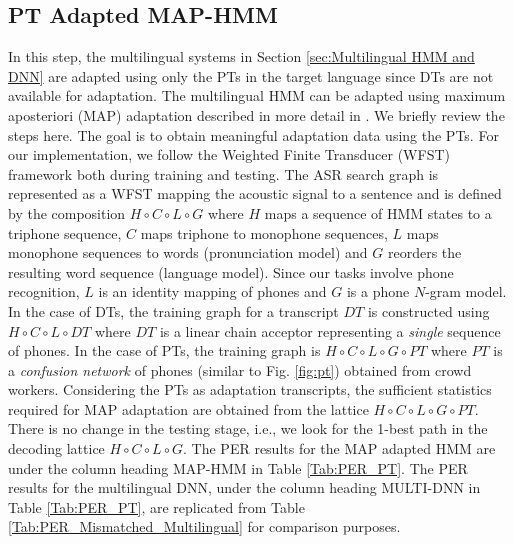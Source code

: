 \documentclass[a4paper]{article}
\begin{document}
\subsection{PT Adapted MAP-HMM} \vspace{-1mm}
\label{sec:PT Adapted MAP-HMM}
In this step, the multilingual systems in Section \ref{sec:Multilingual HMM and DNN} are adapted using only the PTs in the target language since DTs are not available for adaptation. The multilingual HMM can be adapted using maximum aposteriori (MAP) adaptation described in more detail in \cite{Liu-PTAdaptedGMM}. We briefly review the steps here. The goal is to obtain meaningful adaptation data using the PTs. For our implementation, we follow the Weighted Finite Transducer (WFST)~\cite{Mohri-WFST} framework both during training and testing. The ASR search graph is represented as a WFST mapping the acoustic signal to a sentence and is defined by the composition $H \circ C \circ L \circ G$ where $H$ maps a sequence of HMM states to a triphone sequence, $C$ maps triphone to monophone sequences, $L$ maps monophone sequences to words (pronunciation model) and $G$ reorders the resulting word sequence (language model). Since our tasks involve phone recognition, $L$ is an identity mapping of phones and $G$ is a phone $N$-gram model. In the case of DTs, the training graph for a transcript $DT$ is constructed using $H \circ C \circ L \circ DT$ where $DT$ is a linear chain acceptor representing a \emph{single} sequence of phones. In the case of PTs, the training graph is $H \circ C \circ L \circ G \circ PT$ where $PT$ is a \emph{confusion network} of phones (similar to Fig. \ref{fig:pt}) obtained from crowd workers. Considering the PTs as adaptation transcripts, the sufficient statistics required for MAP adaptation are obtained from the lattice  $H \circ C \circ L \circ G \circ PT$. There is no change in the testing stage, i.e., we look for the 1-best path in the decoding lattice $H \circ C \circ L \circ G$. The PER results for the MAP adapted HMM are under the column heading MAP-HMM in Table \ref{Tab:PER_PT}. The PER results for the multilingual DNN, under the column heading MULTI-DNN in Table \ref{Tab:PER_PT}, are replicated from Table \ref{Tab:PER_Mismatched_Multilingual} for comparison purposes.
\end{document}
